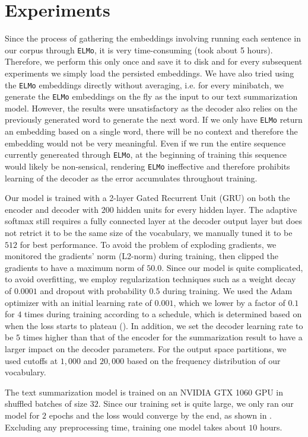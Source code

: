 \section{Experiments}
\label{sec: exp}

Since the process of gathering the embeddings involving running each sentence in our corpus through \texttt{ELMo}, it is very time-consuming (took about 5 hours). Therefore, we perform this only once and save it to disk and for every subsequent experiments we simply load the persisted embeddings. We have also tried using the \texttt{ELMo} embeddings directly without averaging, i.e. for every minibatch, we generate the \texttt{ELMo} embeddings on the fly as the input to our text summarization model. However, the results were unsatisfactory as the decoder also relies on the previously generated word to generate the next word. If we only have \texttt{ELMo} return an embedding based on a single word, there will be no context and therefore the embedding would not be very meaningful. Even if we run the entire sequence currently genereated through \texttt{ELMo}, at the beginning of training this sequence would likely be non-sensical, rendering \texttt{ELMo} ineffective and therefore prohibits learning of the decoder as the error accumulates throughout training.

Our model is trained with a 2-layer Gated Recurrent Unit (GRU) on both the encoder and decoder with $200$ hidden units for every hidden layer. The adaptive softmax still requires a fully connected layer at the decoder output layer but does not retrict it to be the same size of the vocabulary, we manually tuned it to be $512$ for best performance. To avoid the problem of exploding gradients, we monitored the gradients' norm (L2-norm) during training, then clipped the gradients to have a maximum norm of $50.0$. Since our model is quite complicated, to avoid overfitting, we employ regularization techniques such as a weight decay of $0.0001$ and dropout with probability $0.5$ during training. We used the Adam optimizer with an initial learning rate of $0.001$, which we lower by a factor of $0.1$ for $4$ times during training according to a schedule, which is determined based on when the loss starts to plateau (). In addition, we set the decoder learning rate to be $5$ times higher than that of the encoder for the summarization result to have a larger impact on the decoder parameters. For the output space partitions, we used cutoffs at $1,000$ and $20,000$ based on the frequency distribution of our vocabulary. 

The text summarization model is trained on an NVIDIA GTX 1060 GPU in shuffled batches of size $32$. Since our training set is quite large, we only ran our model for $2$ epochs and the loss would converge by the end, as shown in . Excluding any preprocessing time, training one model takes about $10$ hours.



